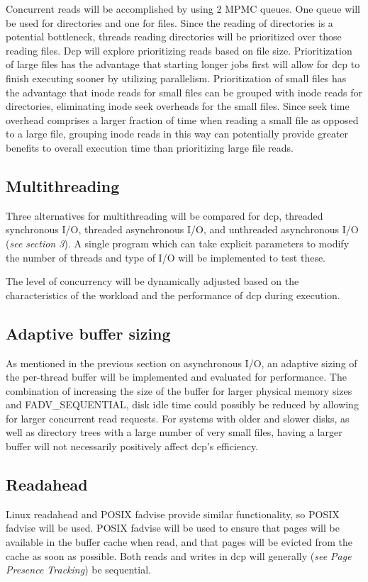 \documentclass[12pt]{article}
\begin{document}
Concurrent reads will be accomplished by using 2 MPMC queues.
One queue will be used for directories and one for files.
Since the reading of directories is a potential bottleneck, threads
reading directories will be prioritized over those reading files.
Dcp will explore prioritizing reads based on file size.
Prioritization of large files has the advantage that starting
longer jobs first will allow for dcp to finish executing sooner
by utilizing parallelism.
Prioritization of small files has the advantage that
inode reads for small files can be grouped with inode reads for
directories, eliminating inode seek overheads for the small files.
Since seek time overhead comprises a larger fraction of time when
reading a small file as opposed to a large file, grouping inode
reads in this way can potentially provide greater benefits to
overall execution time than prioritizing large file reads.

\subsection{Multithreading}
Three alternatives for multithreading will be compared for dcp,
threaded synchronous I/O, threaded asynchronous I/O, and unthreaded
asynchronous I/O (\textit{see section 3}). A single program which
can take explicit parameters to modify the number of threads and
type of I/O will be implemented to test these.

The level of concurrency will be dynamically adjusted based
on the characteristics of the workload and the performance
of dcp during execution.

\subsection{Adaptive buffer sizing}
As mentioned in the previous section on asynchronous I/O, an adaptive
sizing of the per-thread buffer will be implemented and evaluated for
performance. The combination of increasing the size of the buffer for
larger physical memory sizes and FADV\_SEQUENTIAL, disk idle time could
possibly be reduced by allowing for larger concurrent read requests.
For systems with older and slower disks, as well as directory trees
with a large number of very small files, having a larger buffer
will not necessarily positively affect dcp's efficiency.

\subsection{Readahead}
Linux readahead and POSIX fadvise provide similar functionality,
so POSIX fadvise will be used.
POSIX fadvise will be used to ensure that pages will be available
in the buffer cache when read, and that pages will be evicted from
the cache as soon as possible. Both reads and writes in dcp will
generally (\textit{see Page Presence Tracking}) be sequential.
\end{document}
